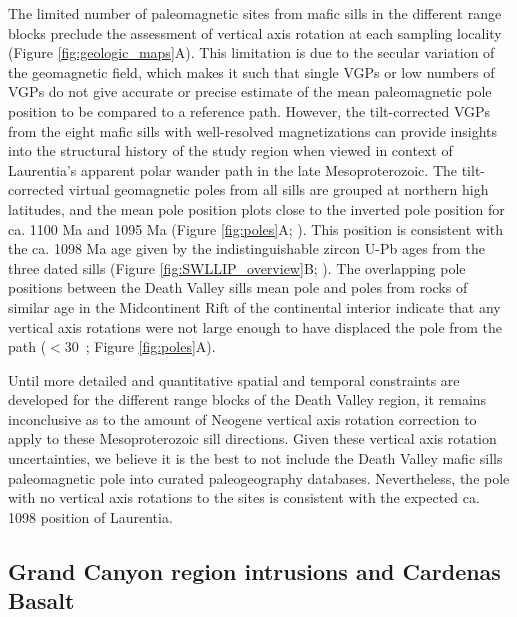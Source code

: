 The limited number of paleomagnetic sites from mafic sills in the different range blocks preclude the assessment of vertical axis rotation at each sampling locality (Figure \ref{fig:geologic_maps}A). This limitation is due to the secular variation of the geomagnetic field, which makes it such that single VGPs or low numbers of VGPs do not give accurate or precise estimate of the mean paleomagnetic pole position to be compared to a reference path. However, the tilt-corrected VGPs from the eight mafic sills with well-resolved magnetizations can provide insights into the structural history of the study region when viewed in context of Laurentia's apparent polar wander path in the late Mesoproterozoic. The tilt-corrected virtual geomagnetic poles from all sills are grouped at northern high latitudes, and the mean pole position plots close to the inverted pole position for ca. 1100 Ma and 1095 Ma (Figure \ref{fig:poles}A; \cite{Swanson-Hysell2019a}). This position is consistent with the ca. 1098 Ma age given by the indistinguishable zircon U-Pb ages from the three dated sills (Figure \ref{fig:SWLLIP_overview}B; \cite{Mohr2024a}). The overlapping pole positions between the Death Valley sills mean pole and poles from rocks of similar age in the Midcontinent Rift of the continental interior indicate that any vertical axis rotations were not large enough to have displaced the pole from the path ($<$30\textdegree\ ; Figure \ref{fig:poles}A).

Until more detailed and quantitative spatial and temporal constraints are developed for the different range blocks of the Death Valley region, it remains inconclusive as to the amount of Neogene vertical axis rotation correction to apply to these Mesoproterozoic sill directions. Given these vertical axis rotation uncertainties, we believe it is the best to not include the Death Valley mafic sills paleomagnetic pole into curated paleogeography databases. Nevertheless, the pole with no vertical axis rotations to the sites is consistent with the expected ca. 1098 position of Laurentia.

\subsection*{Grand Canyon region intrusions and Cardenas Basalt}

